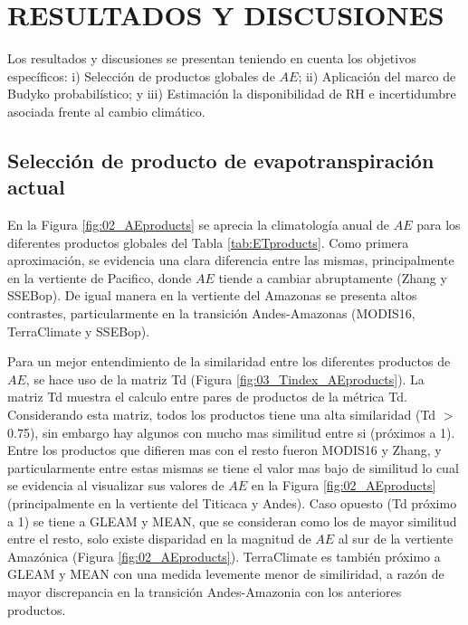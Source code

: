 \documentclass[12pt]{article}
\begin{document}
\clearpage
\vspace*{0.5mm}
\section{RESULTADOS Y DISCUSIONES}

Los resultados y discusiones se presentan teniendo en cuenta los objetivos específicos: i) Selección de productos globales de $AE$; ii) Aplicación del marco de Budyko probabilístico; y iii) Estimación la disponibilidad de RH e incertidumbre asociada frente al cambio climático.

\subsection{Selección de producto de evapotranspiración actual}

En la Figura \ref{fig:02_AEproducts} se aprecia la climatología anual de $AE$ para los diferentes productos globales del Tabla \ref{tab:ETproducts}. Como primera aproximación, se evidencia una clara diferencia entre las mismas, principalmente en la vertiente de Pacifico, donde $AE$ tiende a cambiar abruptamente (Zhang y SSEBop). De igual manera en la vertiente del Amazonas se presenta altos contrastes, particularmente en la transición Andes-Amazonas (MODIS16, TerraClimate y SSEBop). 



Para un mejor entendimiento de la similaridad entre los diferentes productos de $AE$, se hace uso de la matriz Td (Figura \ref{fig:03_Tindex_AEproducts}). La matriz Td muestra el calculo entre pares de productos de la métrica Td. Considerando esta matriz, todos los productos tiene una alta similaridad (Td $>$ 0.75), sin embargo hay algunos con mucho mas similitud entre si (próximos a 1). Entre los productos que difieren mas con el resto fueron MODIS16 y Zhang, y particularmente entre estas mismas se tiene el valor mas bajo de similitud lo cual se evidencia al visualizar sus valores de $AE$ en la Figura \ref{fig:02_AEproducts} (principalmente en la vertiente del Titicaca y Andes). Caso opuesto (Td próximo a 1) se tiene a GLEAM y MEAN, que se consideran como los de mayor similitud entre el resto, solo existe disparidad en la magnitud de $AE$ al sur de la vertiente Amazónica (Figura \ref{fig:02_AEproducts}). TerraClimate es también próximo a GLEAM y MEAN con una medida levemente menor de similiridad, a razón de mayor discrepancia en la transición Andes-Amazonia con los anteriores productos.
\end{document}
